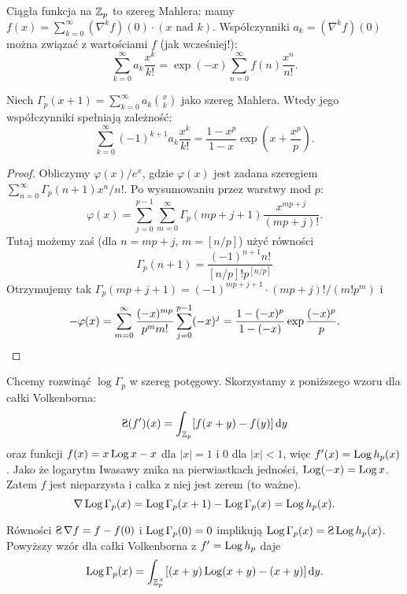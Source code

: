 Ciągła  funkcja na $\mathbb Z_p$ to szereg Mahlera: mamy $f(x) = \sum_{k=0}^\infty (\nabla^k f)(0) \cdot (x\mbox{ nad }k)$.
Współczynniki $a_k = (\nabla^k f)(0)$ można związać z wartościami $f$ (jak wcześniej!):
\[
	\sum_{k=0}^\infty a_k \frac{x^k}{k!} = \exp (-x) \sum_{n=0}^\infty f(n) \frac{x^n}{n!}.
\]

\begin{fakt}
	Niech $\Gamma_p(x+1) = \sum_{k=0}^\infty a_k {x \choose k}$ jako szereg Mahlera.
	Wtedy jego współczynniki spełniają zależność:
	\[
		\sum_{k=0}^\infty (-1)^{k+1} a_k \frac{x^k}{k!}= \frac{1-x^p}{1-x} \exp \left(x + \frac{x^p}p\right).
	\]
\end{fakt}

\begin{proof}
	Obliczymy $\varphi(x)/e^x$, gdzie $\varphi(x)$ jest zadana szeregiem $\sum_{n=0}^\infty \Gamma_p(n+1)x^n/n!$.
	Po wysumowaniu przez warstwy mod $p$:
	\[
		\varphi(x) = \sum_{j=0}^{p-1} \sum_{m=0}^\infty \Gamma_p(mp+j+1) \frac{x^{mp+j}}{(mp+j)!}.
	\]
	Tutaj możemy zaś (dla $n = mp+j$, $m = [n/p]$) użyć równości
	\[
		\Gamma_p(n+1) = \frac{(-1)^{n+1}n!}{[n/p]! p^{[n/p]}}
	\]
	Otrzymujemy tak $\Gamma_p(mp+j+1) = (-1)^{mp+j+1}\cdot (mp+j)! / (m!p^m)$ i
	\[
		- \varphi(x) = \sum_{m=0}^\infty \frac{(-x)^{mp}}{p^m m!}  \sum_{j=0}^{p-1} (-x)^j \\
		= \frac {1- (-x)^p}{1-(-x)} \exp \frac{(-x)^p}{p}. \qedhere
	\]
\end{proof}

Chcemy  rozwinąć $\log \Gamma_p$ w szereg potęgowy.
Skorzystamy z poniższego wzoru dla całki Volkenborna:
\[
	\suma (f')(x) = \int_{\Z_p} [f(x+y) - f(y)] \,\textrm{d}y
\]
oraz funkcji $f(x) = x \operatorname{Log} x - x$ dla $|x| = 1$ %
i $0$ dla $|x| < 1$, %
więc $f'(x) = \operatorname{Log} h_p(x)$.
Jako że logarytm Iwasawy znika na pierwiastkach jedności, $\operatorname{Log}(-x) = \operatorname{Log} x$.
Zatem $f$ jest nieparzysta i całka z niej jest zerem (to ważne).
\[
	\nabla \operatorname{Log} \Gamma_p(x) = \operatorname{Log} \Gamma_p(x+1) - \operatorname{Log} \Gamma_p(x) = \operatorname{Log} h_p(x).
\]

Równości $\suma \nabla f = f -f(0)$ i $\operatorname{Log} \Gamma_p(0) = 0$ implikują $\iwasawa \Gamma_p(x) = \suma \iwasawa h_p(x)$.
Powyższy wzór dla całki Volkenborna z $f' = \operatorname{Log} h_p$ daje
\begin{align*}
	\operatorname{Log} \Gamma_p(x) = \int_{\mathbb Z_p^\times} [(x+y)\operatorname{Log}(x+y) - (x+y)] \,\textrm{d}y.
\end{align*}


